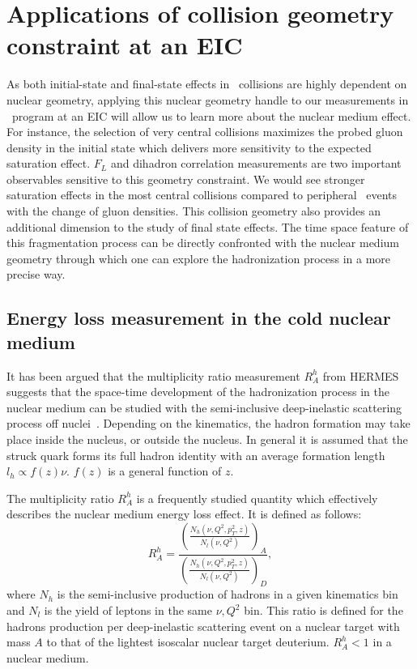 \section{Applications of collision geometry constraint at an EIC}\label{sec:application}

As both initial-state and final-state effects in \eA\ collisions are highly dependent
on nuclear geometry, applying this nuclear geometry handle to our
measurements in \eA\ program at an EIC will allow us to learn more
about the nuclear medium effect. For instance, the selection of very
central collisions maximizes the probed gluon density in the initial state which
delivers more sensitivity to the expected saturation effect. $F_{L}$ and dihadron
correlation measurements are two important observables sensitive to this
geometry constraint. We would see stronger saturation effects in the most
central collisions compared to peripheral \eA\ events with the change of
gluon densities. This collision geometry also provides an additional dimension to
the study of final state effects. The time space feature of this fragmentation
process can be directly confronted with the nuclear medium geometry through
which one can explore the hadronization process in a more precise way.


\subsection{Energy loss measurement in the cold nuclear medium}
It has been argued that the multiplicity ratio measurement $R^{h}_{A}$ from
HERMES suggests that the space-time development of the hadronization process in
the nuclear medium can be studied with the semi-inclusive deep-inelastic
scattering process off nuclei~\cite{Airapetian:2003mi,Airapetian:2007vu,Airapetian:2011jp}. Depending on the
kinematics, the hadron formation may take place inside the nucleus, or
outside the nucleus. In general it is assumed that the struck quark forms its
full hadron identity with an average formation length $l_{h}\propto f(z)\nu$. $f(z)$ is a general function of $z$.

The multiplicity ratio $R^{h}_{A}$ is a frequently studied quantity
which effectively describes the nuclear medium energy loss effect. It is defined as follows:
\begin{equation}
R^{h}_{A}=\frac{(\frac{N_{h}(\nu,Q^{2},p^{2}_{T},z)}{N_{l}(\nu,Q^{2})})_{A}}{(\frac{N_{h}(\nu,Q^{2},p^{2}_{T},z)}{N_{l}(\nu,Q^{2})})_{D}},
\end{equation}
where $N_{h}$ is the semi-inclusive production of hadrons in a given kinematics
bin and $N_{l}$ is the yield of leptons in the same $\nu,Q^{2}$ bin. This ratio
is defined for the hadrons production per deep-inelastic scattering event on a
nuclear target with mass $A$ to that of the lightest isoscalar nuclear target
deuterium. $R^{h}_{A}<1$ in a nuclear medium.

